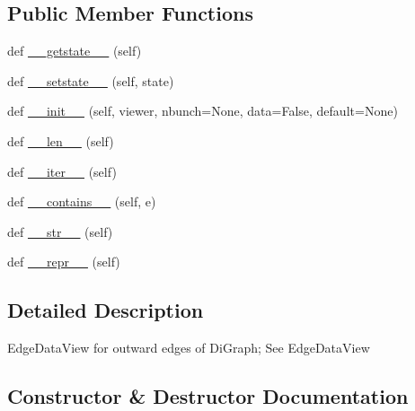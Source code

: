 \subsection*{Public Member Functions}
\begin{DoxyCompactItemize}
\item 
def \hyperlink{classnetworkx_1_1classes_1_1reportviews_1_1OutEdgeDataView_a2abeaaf4e79d566a26cddede1731a76e}{\+\_\+\+\_\+getstate\+\_\+\+\_\+} (self)
\item 
def \hyperlink{classnetworkx_1_1classes_1_1reportviews_1_1OutEdgeDataView_a8a9ec75f6b1f6433e82e49f31d232888}{\+\_\+\+\_\+setstate\+\_\+\+\_\+} (self, state)
\item 
def \hyperlink{classnetworkx_1_1classes_1_1reportviews_1_1OutEdgeDataView_a36eae7fda6e294312e344e21fc2f3665}{\+\_\+\+\_\+init\+\_\+\+\_\+} (self, viewer, nbunch=None, data=False, default=None)
\item 
def \hyperlink{classnetworkx_1_1classes_1_1reportviews_1_1OutEdgeDataView_aedeb099e96bdbd9d6b703364db29fd1f}{\+\_\+\+\_\+len\+\_\+\+\_\+} (self)
\item 
def \hyperlink{classnetworkx_1_1classes_1_1reportviews_1_1OutEdgeDataView_a61aca375eecc1ce47bad3570df742ec9}{\+\_\+\+\_\+iter\+\_\+\+\_\+} (self)
\item 
def \hyperlink{classnetworkx_1_1classes_1_1reportviews_1_1OutEdgeDataView_a78d19338a2d900c5546c3cfe559422b3}{\+\_\+\+\_\+contains\+\_\+\+\_\+} (self, e)
\item 
def \hyperlink{classnetworkx_1_1classes_1_1reportviews_1_1OutEdgeDataView_a97e2de0d6b32f73caa75666b125a4e30}{\+\_\+\+\_\+str\+\_\+\+\_\+} (self)
\item 
def \hyperlink{classnetworkx_1_1classes_1_1reportviews_1_1OutEdgeDataView_a4d785e88f77bc471178a43c566905fa7}{\+\_\+\+\_\+repr\+\_\+\+\_\+} (self)
\end{DoxyCompactItemize}


\subsection{Detailed Description}
\begin{DoxyVerb}EdgeDataView for outward edges of DiGraph; See EdgeDataView\end{DoxyVerb}
 

\subsection{Constructor \& Destructor Documentation}
\mbox{\label{classnetworkx_1_1classes_1_1reportviews_1_1OutEdgeDataView_a36eae7fda6e294312e344e21fc2f3665}} 
